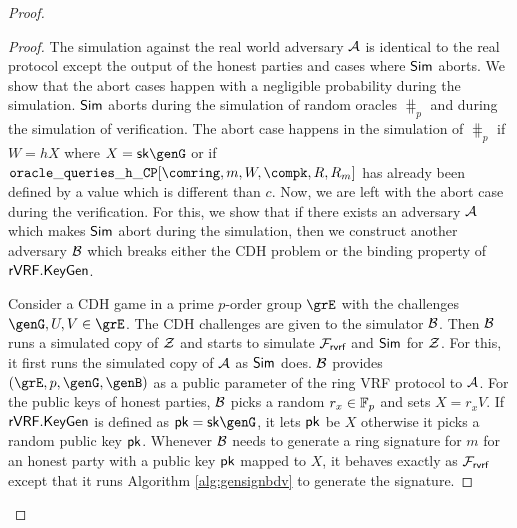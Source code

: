 \begin{proof}
		
		\begin{proof}
			The  simulation against the real world adversary $ \mathcal{A} $ is identical to the real protocol except the output of the honest parties and cases where $ \mathsf{Sim} $ aborts. 
			We show that the abort cases happen with a negligible probability during the simulation. $ \mathsf{Sim} $ aborts during the simulation of random oracles  $ \hash_p $ and during the simulation of verification. The abort case happens in the simulation of $ \hash_p $ if $ W = hX $ where $ X = \sk\genG $ or if $ \mathtt{oracle\_queries\_h\_CP}[\comring,m,W,\compk,R,R_m] $ has already been defined by a value which is different than $ c $. 
			Now, we are left with the abort case during the verification.
			For this, we show that if there exists an adversary $ \mathcal{A} $ which makes $ \mathsf{Sim} $ abort during the simulation, then we construct another adversary $ \mathcal{B} $ which breaks either the CDH problem or the binding property of $ {\mathsf{rVRF}}.{\mathsf{KeyGen}} $.
			
			Consider a CDH game in a prime $ p $-order group  $ \grE $ with the challenges $ \genG,U, V \in \grE$. The CDH challenges are given to the simulator $ \mathcal{B} $. Then $ \mathcal{B} $ runs a simulated copy of $ \mathcal{Z} $ and starts to simulate $ \mathcal{F}_{\textsf{rvrf}} $ and $ \mathsf{Sim} $ for $ \mathcal{Z} $. For this, it first runs the simulated copy of $ \mathcal{A} $ as $ \mathsf{Sim} $ does. $ \mathcal{B} $ provides $ (\grE, p, \genG , \genB) $ as a public parameter of the ring VRF protocol to $ \mathcal{A} $.	For the public keys of honest parties, $ \mathcal{B} $ picks a random $ r_x\in \mathbb{F}_p $ and sets $ X =r_xV$. If $ {\mathsf{rVRF}}.{\mathsf{KeyGen}} $ is defined as $ \pk = \sk \genG $, it lets $ \mathsf{pk} $ be $ X $ otherwise it picks a random public key $ \mathsf{pk} $. Whenever $ \mathcal{B} $ needs to generate a ring signature for $ m $ for an honest party with a public key $ \mathsf{pk} $ mapped to $X $, it behaves exactly as $ \mathcal{F}_{\textsf{rvrf}} $ except that it runs   Algorithm \ref{alg:gensignbdv} to generate the signature. 
			

\end{proof}
\end{proof}
